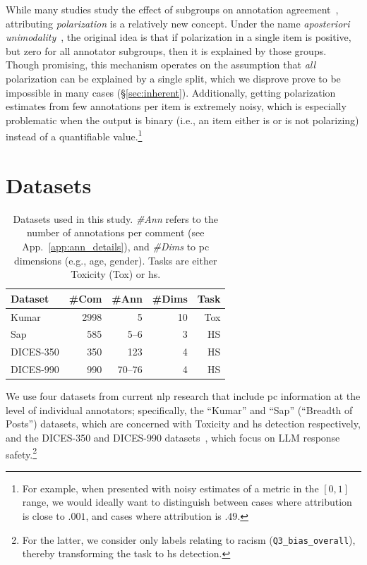 \documentclass{article} %
\theoremstyle{definition}
\theoremstyle{plain}
\begin{document}
While many studies study the effect of subgroups on annotation agreement~\cite{goyal2022your, binns2017like, giorgi2025human, al2020identifying, sachdeva2022assessing}, attributing \emph{polarization} is a relatively new concept. Under the name \emph{aposteriori unimodality}~\cite{pavlopoulos-likas-2024}, the original idea is that if polarization in a single item is positive, but zero for all annotator subgroups, then it is explained by those groups. Though promising, this mechanism operates on the assumption that \emph{all} polarization can be explained by a single split, which we disprove prove to be impossible in many cases (\S\ref{sec:inherent}). Additionally, getting polarization estimates from few annotations per item is extremely noisy, which is especially problematic when the output is binary (i.e., an item either is or is not polarizing) instead of a quantifiable value.\footnote{For example, when presented with noisy estimates of a metric in the  $[0,1]$ range, we would ideally want to distinguish between cases where attribution is close to $.001$, and cases where attribution is $.49$.} 


\section{Datasets}
\label{sec:datasets}

\begin{table}[t]
	\centering
	\small
	\begin{tabular}{lrrrr}
		\toprule
		\textbf{Dataset} & \textbf{\#Com} & \textbf{\#Ann} & \textbf{\#Dims} & \textbf{Task} \\
		\midrule
		Kumar
		& 2998 & 5   & 10 & Tox \\
		
		Sap 
		& 585       & 5--6   & 3  & HS \\
		
		DICES-350 
		& 350   & 123    & 4  & HS \\
		
		DICES-990
		& 990  & 70--76 & 4  & HS\\
		\bottomrule
	\end{tabular}
	\caption{Datasets used in this study. \textit{\#Ann} refers to the number of annotations per comment (see App.~\ref{app:ann_details}), and \textit{\#Dims} to \ac{pc} dimensions (e.g., age, gender). Tasks are either Toxicity (Tox) or \ac{hs}.}
	\label{tab:datasets}
\end{table}

We use four datasets from current \ac{nlp} research that include \ac{pc} information at the level of individual annotators; specifically, the ``Kumar'' \cite{kumar-et-al-2021} and ``Sap'' (``Breadth of Posts'') \cite{sap-etal-2022-annotators} datasets, which are concerned with Toxicity and \ac{hs} detection respectively, and the DICES-350 and DICES-990 datasets~\cite{dices}, which focus on LLM response safety.\footnote{For the latter, we consider only labels relating to racism (\texttt{Q3\_bias\_overall}), thereby transforming the task to \ac{hs} detection.}
\end{document}
